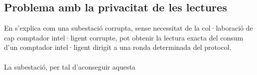 \documentclass{article}
\begin{document}
\subsection{Problema amb la privacitat de les lectures}
En \cite{repair-busom} s'explica com una subestació corrupta, sense necessitat de la col·laboració de cap comptador intel·ligent corrupte, pot obtenir la lectura exacta del consum d'un comptador intel·ligent dirigit a una ronda determinada del protocol.
\\
\\
La subestació, per tal d'aconseguir aquesta
\end{document}
